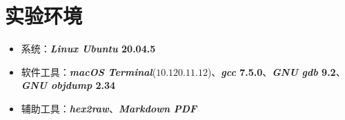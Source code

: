 \section{实验环境}
    \begin{itemize}
        \item 系统：\textbf{\textit{Linux Ubuntu} 20.04.5} 
        \item 软件工具：\textbf{\textit{macOS Terminal}}($10.120.11.12$)、\textbf{\textit{gcc} 7.5.0}、\textbf{\textit{GNU gdb} 9.2}、\textbf{\textit{GNU objdump} 2.34}
        \item 辅助工具：\textbf{\textit{hex2raw}}、\textbf{\textit{Markdown PDF}}
    \end{itemize}
